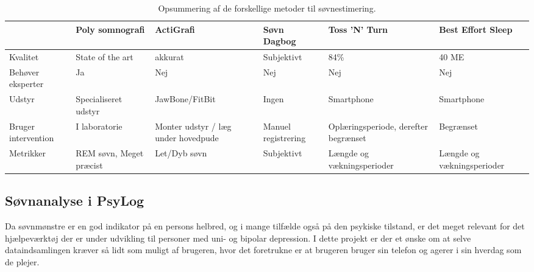 \begin{table}[h]
\begin{tabular}{|p{1.5cm}|p{2cm}|p{3cm}|p{2cm}|p{3cm}|p{2cm}|}
\hline                    	& Poly somnografi      		& ActiGrafi                           & Søvn Dagbog          & Toss 'N' Turn                        & Best Effort Sleep \\ 
\hline Kvalitet           	& State of the art			& akkurat                & Subjektivt           & 84\%   		& 40 ME \\ 
\hline Behøver eksperter   	& Ja						& Nej                                 & Nej                  & Nej    		& Nej \\ 
\hline Udstyr              	& Specialiseret udstyr		& JawBone/FitBit                      & Ingen                  & Smartphone   & Smartphone \\ 
\hline Bruger intervention 	& I laboratorie	& Monter udstyr / læg under hovedpude & Manuel registrering  & Oplæringsperiode, derefter begrænset & Begrænset \\ 
\hline Metrikker           	& REM søvn, Meget præcist	& Let/Dyb søvn                        & Subjektivt           & Længde og vækningsperioder & Længde og vækningsperioder \\ 
\hline 
\end{tabular}
\caption{Opsummering af de forskellige metoder til søvnestimering.}
\label{tab:opsummeringMetoder}
\end{table}

\subsection{Søvnanalyse i PsyLog}
Da søvnmønstre er en god indikator på en persons helbred, og i mange tilfælde også på den psykiske tilstand, er det meget relevant for det hjælpeværktøj der er under udvikling til personer med uni- og bipolar depression.
I dette projekt er der et ønske om at selve dataindsamlingen kræver så lidt som muligt af brugeren, hvor det foretrukne er at brugeren bruger sin telefon og agerer i sin hverdag som de plejer.

